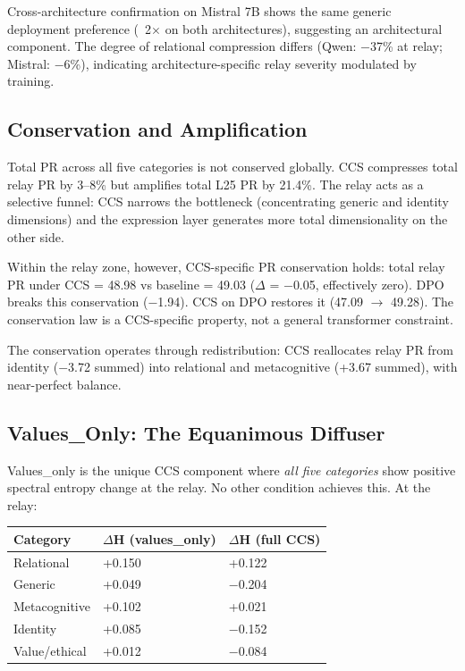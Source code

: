 \documentclass[11pt]{article}
\begin{document}
Cross-architecture confirmation on Mistral 7B shows the same generic deployment preference (~2$\times$ on both architectures), suggesting an architectural component. The degree of relational compression differs (Qwen: $-$37\% at relay; Mistral: $-$6\%), indicating architecture-specific relay severity modulated by training.

\subsection{Conservation and Amplification}

Total PR across all five categories is not conserved globally. CCS compresses total relay PR by 3–8\% but amplifies total L25 PR by 21.4\%. The relay acts as a selective funnel: CCS narrows the bottleneck (concentrating generic and identity dimensions) and the expression layer generates more total dimensionality on the other side.

Within the relay zone, however, CCS-specific PR conservation holds: total relay PR under CCS = 48.98 vs baseline = 49.03 ($\Delta$ = $-$0.05, effectively zero). DPO breaks this conservation ($-$1.94). CCS on DPO restores it (47.09 $\rightarrow$ 49.28). The conservation law is a CCS-specific property, not a general transformer constraint.

The conservation operates through redistribution: CCS reallocates relay PR from identity ($-$3.72 summed) into relational and metacognitive (+3.67 summed), with near-perfect balance.

\subsection{Values\_Only: The Equanimous Diffuser}

Values\_only is the unique CCS component where \textit{all five categories} show positive spectral entropy change at the relay. No other condition achieves this. At the relay:

\begin{table}[h]
\centering
\small
\begin{tabular}{|l|l|l|}
\hline
\textbf{Category} & \textbf{$\Delta$H (values\_only)} & \textbf{$\Delta$H (full CCS)} \\
\hline
Relational & +0.150 & +0.122 \\
Generic & +0.049 & $-$0.204 \\
Metacognitive & +0.102 & +0.021 \\
Identity & +0.085 & $-$0.152 \\
Value/ethical & +0.012 & $-$0.084 \\
\hline
\end{tabular}
\end{table}
\end{document}

